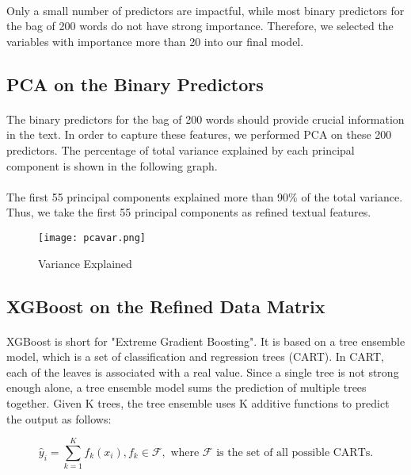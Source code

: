 \documentclass[paper=a4, fontsize=11pt]{scrartcl} %
\numberwithin{equation}{section} %
\numberwithin{figure}{section} %
\numberwithin{table}{section} %
\begin{document}
{\paragraph{}
Only a small number of predictors are impactful, while most binary predictors for the bag of 200 words do not have strong importance. Therefore, we selected the variables with importance more than 20 into our final model.

\subsection{PCA on the Binary Predictors}
\paragraph{}
The binary predictors for the bag of 200 words should provide crucial information in the text. In order to capture these features, we performed PCA on these 200 predictors. The percentage of total variance explained by each principal component is shown in the following graph.
\paragraph{}
The first 55 principal components explained more than 90\% of the total variance. Thus, we take the first 55 principal components as refined textual features.

\begin{figure}[H]
    \centering
        \texttt{[image: pcavar.png]} 
        \caption{Variance Explained}
\end{figure}

\subsection{XGBoost on the Refined Data Matrix}
\paragraph{}
XGBoost is short for "Extreme Gradient Boosting". It is based on a tree ensemble model, which is a set of classification and regression trees (CART). In CART, each of the leaves is associated with a real value. Since a single tree is not strong enough alone, a tree ensemble model sums the prediction of multiple trees together. Given K trees, the tree ensemble uses K additive functions to predict the output as follows:

$$\hat{y}_i = \sum_{k=1}^K f_k (x_i), f_k \in \mathcal{F}, \text{ where } \mathcal{F} \text{ is the set of all possible CARTs}.$$
}
\end{document}
